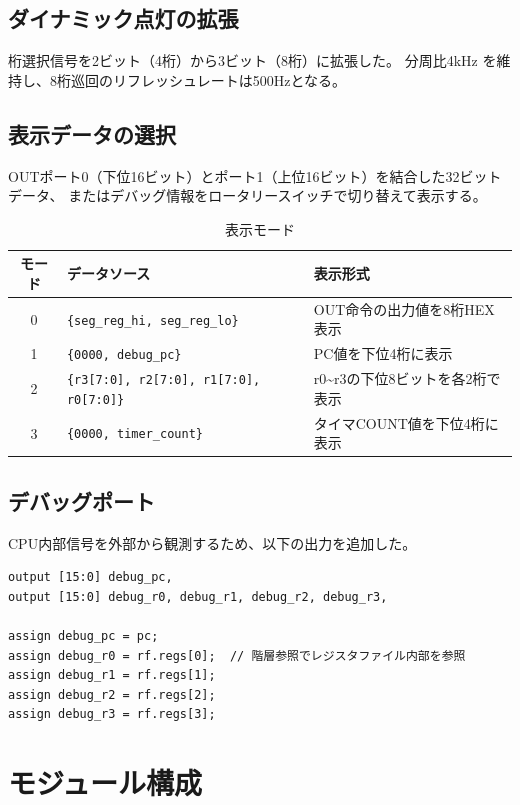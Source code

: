 \documentclass[a4paper,11pt]{ltjsarticle}
\begin{document}
\subsection{ダイナミック点灯の拡張}

桁選択信号を2ビット（4桁）から3ビット（8桁）に拡張した。
分周比4kHz を維持し、8桁巡回のリフレッシュレートは500Hzとなる。

\subsection{表示データの選択}

OUTポート0（下位16ビット）とポート1（上位16ビット）を結合した32ビットデータ、
またはデバッグ情報をロータリースイッチで切り替えて表示する。

\begin{table}[h]
\centering
\caption{表示モード}
\begin{tabular}{clp{7cm}}
\toprule
モード & データソース & 表示形式 \\
\midrule
0 & \texttt{\{seg\_reg\_hi, seg\_reg\_lo\}} & OUT命令の出力値を8桁HEX表示 \\
1 & \texttt{\{0000, debug\_pc\}} & PC値を下位4桁に表示 \\
2 & \texttt{\{r3[7:0], r2[7:0], r1[7:0], r0[7:0]\}} & r0\textasciitilde r3の下位8ビットを各2桁で表示 \\
3 & \texttt{\{0000, timer\_count\}} & タイマCOUNT値を下位4桁に表示 \\
\bottomrule
\end{tabular}
\end{table}

\subsection{デバッグポート}

CPU内部信号を外部から観測するため、以下の出力を追加した。

\begin{lstlisting}[caption={デバッグポートの実装}]
output [15:0] debug_pc,
output [15:0] debug_r0, debug_r1, debug_r2, debug_r3,

assign debug_pc = pc;
assign debug_r0 = rf.regs[0];  // 階層参照でレジスタファイル内部を参照
assign debug_r1 = rf.regs[1];
assign debug_r2 = rf.regs[2];
assign debug_r3 = rf.regs[3];
\end{lstlisting}


\section{モジュール構成}
\end{document}
